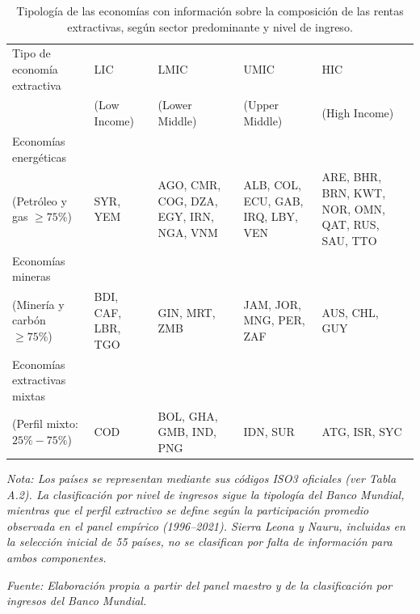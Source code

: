 \documentclass[../../TFM.tex]{subfiles}
\begin{document}
	\begin{table}[htbp]
		\centering
		\small
		\caption[Tipología de economías extractivas]{Tipología de las economías con información sobre la composición de las rentas extractivas, según sector predominante y nivel de ingreso.}
		\label{tab:extractive_typology}

		\begin{threeparttable}
				\begin{tabularx}{\linewidth}{L{3.5cm}*{4}{>{\RaggedRight\arraybackslash}X}}
					\toprule
					Tipo de economía extractiva & LIC & LMIC & UMIC & HIC \\
					& (Low Income) & (Lower Middle) & (Upper Middle) & (High Income) \\
					\midrule

					Economías energéticas \\
					(Petróleo y gas $\geq 75\%$)
					& SYR, YEM
					& AGO, CMR, COG, DZA, EGY, IRN, NGA, VNM
					& ALB, COL, ECU, GAB, IRQ, LBY, VEN
					& ARE, BHR, BRN, KWT, NOR, OMN, QAT, RUS, SAU, TTO \\

					\addlinespace

					Economías mineras \\
					(Minería y carbón $\geq 75\%$)
					& BDI, CAF, LBR, TGO
					& GIN, MRT, ZMB
					& JAM, JOR, MNG, PER, ZAF
					& AUS, CHL, GUY \\

					\addlinespace

					Economías extractivas mixtas \\
					(Perfil mixto: $25\% - 75\%$)
					& COD
					& BOL, GHA, GMB, IND, PNG
					& IDN, SUR
					& ATG, ISR, SYC \\

					\bottomrule
				\end{tabularx}

			\begin{tablenotes}
				\footnotesize
				\item \textit{Nota: Los países se representan mediante sus códigos ISO3 oficiales (ver Tabla A.2). La clasificación por nivel de ingresos sigue la tipología del Banco Mundial, mientras que el perfil extractivo se define según la participación promedio observada en el panel empírico (1996--2021). Sierra Leona y Nauru, incluidas en la selección inicial de 55 países, no se clasifican por falta de información para ambos componentes.}
				\item \textit{Fuente: Elaboración propia a partir del panel maestro y de la clasificación por ingresos del Banco Mundial.}
			\end{tablenotes}
		\end{threeparttable}
	\end{table}
\end{document}

